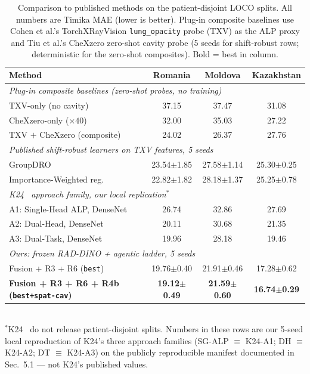 \begin{table}[t]
\centering
\caption{Comparison to published methods on the patient-disjoint LOCO splits. All numbers are Timika MAE (lower is better). Plug-in composite baselines use Cohen et al.'s TorchXRayVision \texttt{lung\_opacity} probe (TXV) as the ALP proxy and Tiu et al.'s CheXzero zero-shot cavity probe (5 seeds for shift-robust rows; deterministic for the zero-shot composites). Bold = best in column.}
\label{tab:published_baselines}
\setlength{\tabcolsep}{6pt}
\small
\begin{tabular}{l c c c}
\toprule
Method & Romania & Moldova & Kazakhstan \\
\midrule
\multicolumn{4}{l}{\textit{Plug-in composite baselines (zero-shot probes, no training)}} \\
TXV-only (no cavity)~\cite{cohen2022torchxrayvision}        & 37.15 & 37.47 & 31.08 \\
CheXzero-only ($\times 40$)~\cite{tiu2022chexzero}          & 32.00 & 35.03 & 27.22 \\
TXV $+$ CheXzero (composite)                                & 24.02 & 26.37 & 27.76 \\
\midrule
\multicolumn{4}{l}{\textit{Published shift-robust learners on TXV features, 5 seeds}} \\
GroupDRO~\cite{sagawa2020distributionally}                   & 23.54$\pm$1.85 & 27.58$\pm$1.14 & 25.30$\pm$0.25 \\
Importance-Weighted reg.~\cite{shimodaira2000improving}      & 22.82$\pm$1.82 & 28.18$\pm$1.37 & 25.25$\pm$0.78 \\
\midrule
\multicolumn{4}{l}{\textit{K24~\cite{kantipudi2024} approach family, our local replication}$^\ast$} \\
A1: Single-Head ALP, DenseNet                                & 26.74 & 32.86 & 27.69 \\
A2: Dual-Head, DenseNet                                      & 20.11 & 30.68 & 21.35 \\
A3: Dual-Task, DenseNet                                      & 19.96 & 28.18 & 19.46 \\
\midrule
\multicolumn{4}{l}{\textit{Ours: frozen RAD-DINO + agentic ladder, 5 seeds}} \\
Fusion + R3 + R6 (\texttt{best})                             & 19.76$\pm$0.40 & 21.91$\pm$0.46 & 17.28$\pm$0.62 \\
\textbf{Fusion + R3 + R6 + R4b (\texttt{best+spat-cav})}     & \textbf{19.12$\pm$0.49} & \textbf{21.59$\pm$0.60} & \textbf{16.74$\pm$0.29} \\
\bottomrule
\end{tabular}
\\[3pt]
{\footnotesize $^\ast$K24~\cite{kantipudi2024} do not release patient-disjoint splits. Numbers in these rows are our 5-seed local reproduction of K24's three approach families (SG-ALP $\equiv$ K24-A1; DH $\equiv$ K24-A2; DT $\equiv$ K24-A3) on the publicly reproducible manifest documented in Sec.~5.1 --- not K24's published values.}
\end{table}
